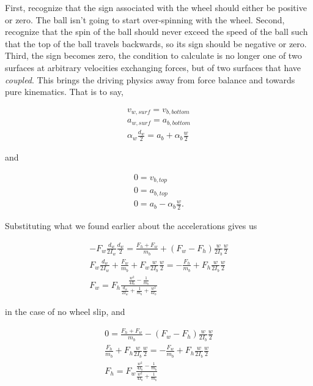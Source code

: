\documentclass[10pt,letterpaper]{article}
\begin{document}
	First, recognize that the sign associated with the wheel should either be positive or zero. The ball isn't going to start over-spinning with the wheel.
	Second, recognize that the spin of the ball should never exceed the speed of the ball such that the top of the ball travels backwards, so its sign should be negative or zero.
	Third, the sign becomes zero, the condition to calculate is no longer one of two surfaces at arbitrary velocities exchanging forces, but of two surfaces that have \textit{coupled}. This brings the driving physics away from force balance and towards pure kinematics. That is to say,

	\begin{align}
		v_{w,surf} = v_{b,bottom} \nonumber \\
		a_{w,surf} = a_{b,bottom} \nonumber \\
		\alpha_{w} \frac{d_w}{2} = a_{b} + \alpha_{b} \frac{w}{2}
	\end{align}

	and

	\begin{align}
		0 = v_{b,top} \nonumber \\
		0 = a_{b,top} \nonumber \\
		0 = a_{b} - \alpha_{b} \frac{w}{2} .
	\end{align}

	Substituting what we found earlier about the accelerations gives us

	\begin{align}
		- F_w \frac{d_w}{2 I_w} \frac{d_w}{2} = \frac{F_h + F_w}{m_b} + (F_w - F_h) \frac{w}{2 I_b} \frac{w}{2} \nonumber \\
		F_w \frac{d_w}{2 I_w} + \frac{F_w}{m_b} + F_w \frac{w}{2 I_b} \frac{w}{2} = - \frac{F_h}{m_b} + F_h \frac{w}{2 I_b} \frac{w}{2} \nonumber \\
		F_w = F_h \frac{\frac{w^2}{4 I_b} - \frac{1}{m_b}}{\frac{d_w}{2 I_w} + \frac{1}{m_b} + \frac{w^2}{4 I_b}}
	\end{align}

	in the case of no wheel slip, and

	\begin{align}
		0 = \frac{F_h + F_w}{m_b} - (F_w - F_h) \frac{w}{2 I_b} \frac{w}{2} \nonumber \\
		\frac{F_h}{m_b} + F_h \frac{w}{2 I_b} \frac{w}{2} = - \frac{F_w}{m_b} + F_h \frac{w}{2 I_b} \frac{w}{2} \nonumber \\
		F_h = F_w \frac{\frac{w^2}{4 I_b} - \frac{1}{m_b}}{\frac{w^2}{4 I_b} + \frac{1}{m_b}} 
	\end{align}
\end{document}
